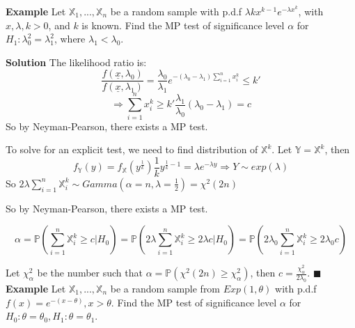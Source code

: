 \textbf{Example} Let $\mathbb{X}_1, ..., \mathbb{X}_n$ be a random sample with p.d.f $\lambda kx^{k-1}e^{-\lambda x^k}$, with $x, \lambda, k>0$, and $k$ is known. Find the MP test of significance level $\alpha$ for $H_1: \lambda_0^2 = \lambda_1^2$, where $\lambda_1 < \lambda_0$.

\textbf{Solution} The likelihood ratio is:
$$\frac{f(\underline{x}, \lambda_0)}{f(\underline{x}, \lambda_1)} = \frac{\lambda_0}{\lambda_1} e^{-(\lambda_0 - \lambda_1)\sum_{i=1}^n x_i^k} \leq k'
$$
$$\Rightarrow \sum_{i=1}^n x_i^k \geq k' \frac{\lambda_1}{\lambda_0}(\lambda_0 - \lambda_1) = c$$
So by Neyman-Pearson, there exists a MP test. 


To solve for an explicit test, we need to find distribution of $\mathbb{X}^k$. Let $\mathbb{Y} = \mathbb{X}^k$, then
$$f_{\mathbb{Y}}(y) = f_{\mathbb{X}}(y^{\frac{1}{k}}) \frac{1}{k} y^{\frac{1}{k}-1}  = \lambda e^{-\lambda y} \Rightarrow Y \sim exp(\lambda)$$
So $2 \lambda \sum_{i=1}^n \mathbb{X}_i^k \sim Gamma(\alpha = n, \lambda = \frac{1}{2}) = \chi^2(2n)$

So by Neyman-Pearson, there exists a MP test.

$$\alpha = \mathbb{P}(\sum_{i=1}^n \mathbb{X}_i^k \geq c | H_0 ) = \mathbb{P}(2 \lambda \sum_{i=1}^n \mathbb{X}_i^k \geq 2 \lambda c | H_0) = \mathbb{P}(2\lambda_0 \sum_{i=1}^n \mathbb{X}_i^k \geq 2 \lambda_0 c)$$

Let $\chi^2_\alpha$ be the number such that $\alpha = \mathbb{P}(\chi^2(2n) \geq \chi_\alpha^2)$, then $c = \frac{\chi^2_\alpha}{2 \lambda_0}$. $\blacksquare$\\

\textbf{Example} Let $\mathbb{X}_1, ..., \mathbb{X}_n$ be a random sample from $Exp(1, \theta)$ with p.d.f $f(x) = e^{-(x-\theta)}, x>\theta$. Find the MP test of significance level $\alpha$ for $H_0:  \theta = \theta_0, H_1: \theta = \theta_1$.

